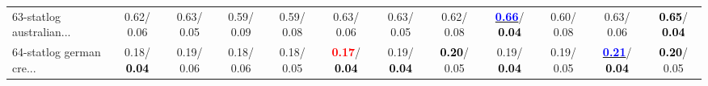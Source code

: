\begin{table}[h]
\begin{center}
{\begin{tabular}{lc|c|c|c|c|c|c|c|c|c|c}
63-statlog australian... &   0.62/  0.06 &   0.63/  0.05 &   0.59/  0.09 &   0.59/  0.08 &   0.63/  0.06 &   0.63/  0.05 &   0.62/  0.08 & \underline{\textcolor{blue}{\textbf{  0.66}}}/\textcolor{black}{\textbf{  0.04}} &   0.60/  0.08 &   0.63/  0.06 & \textcolor{black}{\textbf{  0.65}}/\textcolor{black}{\textbf{  0.04}} \\
64-statlog german cre... &   0.18/\textcolor{black}{\textbf{  0.04}} &   0.19/  0.06 &   0.18/  0.06 &   0.18/  0.05 & \textcolor{red}{\textbf{  0.17}}/\textcolor{black}{\textbf{  0.04}} &   0.19/\textcolor{black}{\textbf{  0.04}} & \textcolor{black}{\textbf{  0.20}}/  0.05 &   0.19/\textcolor{black}{\textbf{  0.04}} &   0.19/  0.05 & \underline{\textcolor{blue}{\textbf{  0.21}}}/\textcolor{black}{\textbf{  0.04}} & \textcolor{black}{\textbf{  0.20}}/  0.05 \\\end{tabular}}\label{stratsALCKappa1aC4.5Redux}
\end{center}
\end{table}
